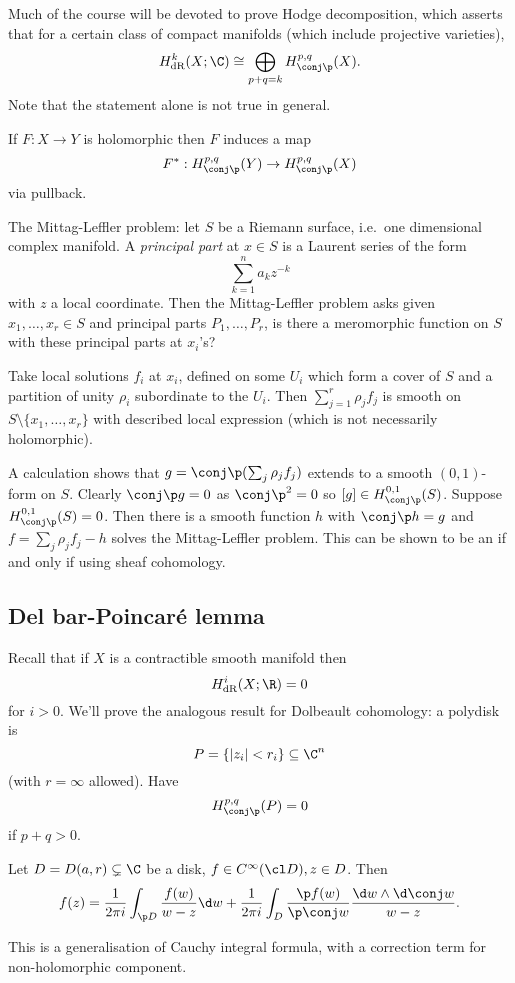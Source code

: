 \documentclass[a4paper]{article}
\newcommand{\w}{\wedge} %
\begin{document}
Much of the course will be devoted to prove Hodge decomposition, which asserts that for a certain class of compact manifolds (which include projective varieties),
\[
  H_{\text{dR}}^k(X; \C) \cong \bigoplus_{p + q = k} H_{\conj \p}^{p, q}(X).
\]
Note that the statement alone is not true in general.

\begin{ex}
  If \(F: X \to Y\) is holomorphic then \(F\) induces a map
  \[
    F^*: H_{\conj \p}^{p, q}(Y) \to H_{\conj \p}^{p, q}(X)
  \]
  via pullback.
\end{ex}

The Mittag-Leffler problem:  let \(S\) be a Riemann surface, i.e.\ one dimensional complex manifold. A \emph{principal part} at \(x \in S\) is a Laurent series of the form
\[
  \sum_{k = 1}^n a_k z^{-k}
\]
with \(z\) a local coordinate. Then the Mittag-Leffler problem asks given \(x_1, \dots, x_r \in S\) and principal parts \(P_1, \dots, P_r\), is there a meromorphic function on \(S\) with these principal parts at \(x_i\)'s?

Take local solutions \(f_i\) at \(x_i\), defined on some \(U_i\) which form a cover of \(S\)  and a partition of unity \(\rho_i\) subordinate to the \(U_i\). Then \(\sum_{j = 1}^r \rho_j f_j\) is smooth on \(S \setminus \{x_1, \dots, x_r\}\) with described local expression (which is not necessarily holomorphic).

A calculation shows that \(g = \conj \p (\sum_j \rho_j f_j)\) extends to a smooth \((0, 1)\)-form on \(S\). Clearly \(\conj \p g = 0\) as \(\conj \p^2 = 0\) so \([g] \in H_{\conj \p}^{0, 1}(S)\). Suppose \(H_{\conj \p}^{0, 1}(S) = 0\). Then there is a smooth function \(h\) with \(\conj \p h = g\) and \(f = \sum_j \rho_j f_j - h\) solves the Mittag-Leffler problem. This can be shown to be an if and only if using sheaf cohomology.

\subsection{Del bar-Poincaré lemma}

Recall that if \(X\) is a contractible smooth manifold then
\[
  H_{\text{dR}}^i (X; \R) = 0
\]
for \(i > 0\). We'll prove the analogous result for Dolbeault cohomology: a polydisk is
\[
  P = \{|z_i| < r_i\} \subseteq \C^n
\]
(with \(r = \infty\) allowed). Have
\[
  H_{\conj \p}^{p, q}(P) = 0
\]
if \(p + q > 0\).

\begin{proposition}
  Let \(D = D(a, r) \subsetneq \C\) be a disk, \(f \in C^\infty(\cl D), z \in D\). Then
  \[
    f(z) = \frac{1}{2\pi i} \int_{\p D}\frac{f(w)}{w - z} \d w + \frac{1}{2\pi i} \int_D \frac{\p f(w)}{\p \conj w} \frac{\d w \w \d \conj w}{w - z}.
  \]
\end{proposition}
This is a generalisation of Cauchy integral formula, with a correction term for non-holomorphic component.
\end{document}
